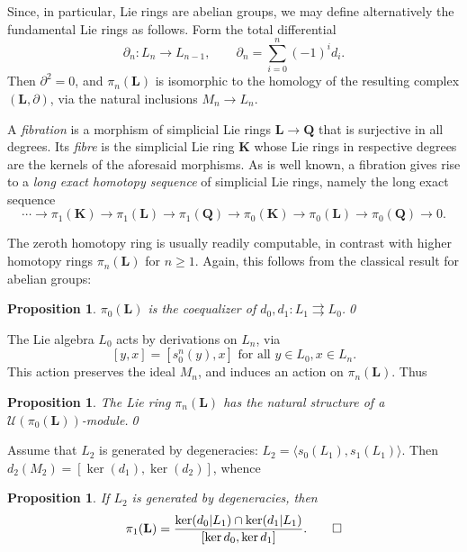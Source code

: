 \documentclass[a4paper,reqno,notitlepage]{amsart}
\newtheorem{prop}[theorem]{Proposition}
\theoremstyle{definition}
\newcommand\U{\mathscr U}
\begin{document}
Since, in particular, Lie rings are abelian groups, we may define
alternatively the fundamental Lie rings as follows. Form the
total differential
\[\partial_n:L_n\to L_{n-1},\qquad\partial_n=\sum_{i=0}^n(-1)^i d_i.\]
Then $\partial^2=0$, and $\pi_n(\mathbf L)$ is isomorphic to the
homology of the resulting complex $(\mathbf L,\partial)$, via the
natural inclusions $M_n\to L_n$.

A \emph{fibration} is a morphism of simplicial Lie rings $\mathbf
L\to\mathbf Q$ that is surjective in all degrees. Its \emph{fibre} is
the simplicial Lie ring $\mathbf K$ whose Lie rings in respective
degrees are the kernels of the aforesaid morphisms. As is well known,
a fibration gives rise to a \emph{long exact homotopy sequence} of
simplicial Lie rings, namely the long exact sequence
\[\cdots\to \pi_1(\mathbf K)\to \pi_1(\mathbf L)\to \pi_1(\mathbf Q)\to
\pi_0(\mathbf K)\to \pi_0(\mathbf L)\to \pi_0(\mathbf Q)\to 0.
\]

The zeroth homotopy ring is usually readily computable, in contrast
with higher homotopy rings $\pi_n(\mathbf L)$ for $n\geq 1$. Again, this
follows from the classical result for abelian groups:
\begin{prop}\label{prop:coequalizer}
  $\pi_0(\mathbf L)$ is the coequalizer of
  $d_0,d_1:L_1\rightrightarrows L_0$.\qed
\end{prop}

The Lie algebra $L_0$ acts by derivations on $L_n$, via
\[[y,x]=[s_0^n(y),x]\text{ for all }y\in L_0,x\in L_n.
\]
This action preserves the ideal $M_n$, and induces an action on
$\pi_n(\mathbf L)$. Thus
\begin{prop}
  The Lie ring $\pi_n(\mathbf L)$ has the natural structure of a
  $\U(\pi_0(\mathbf L))$-module.\qed
\end{prop}

Assume that $L_2$ is generated by degeneracies: $L_2=\langle
s_0(L_1),s_1(L_1)\rangle$. Then $d_2(M_2)= [\ker(d_1),\ker(d_2)]$, whence
\begin{prop}
  If $L_2$ is generated by degeneracies, then
  \[\pi_1(\mathbf L)=\frac{\ker(d_0|L_1)\cap\ker(d_1|L_1)}{[\ker d_0,\ker d_1]}.\qed\]
\end{prop}
\end{document}
